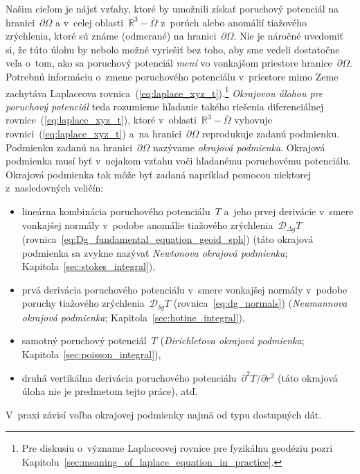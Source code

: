 \documentclass[a4paper, 12pt]{book}
\newcommand{\DIFF}{\mathcal D}
\begin{document}
Našim cieľom je nájsť vzťahy, ktoré by umožnili získať poruchový potenciál na 
hranici~$\partial \Omega$ a v~celej oblasti~$\mathbb{R}^3 - \overline{\Omega}$ 
z~porúch alebo anomálií tiažového zrýchlenia, ktoré sú známe (odmerané) na 
hranici~$\partial \Omega$.  Nie je náročné uvedomiť si, že túto úlohu by nebolo 
možné vyriešiť bez toho, aby sme vedeli dostatočne veľa o~tom, ako sa poruchový 
potenciál \emph{mení} vo vonkajšom priestore hranice~$\partial\Omega$.  
Potrebnú informáciu o~zmene poruchového potenciálu v~priestore mimo Zeme 
zachytáva Laplaceova rovnica~(\ref{eq:laplace_xyz_t}).\footnote{Pre diskusiu 
o~význame Laplaceovej rovnice pre fyzikálnu geodéziu pozri 
Kapitolu~\ref{sec:meaning_of_laplace_equation_in_practice}.}  \emph{Okrajovou 
úlohou pre poruchový potenciál} teda rozumieme hľadanie takého riešenia 
diferenciálnej rovnice~(\ref{eq:laplace_xyz_t}), ktoré v~oblasti~$\mathbb{R}^3 
- \overline\Omega$ vyhovuje rovnici~(\ref{eq:laplace_xyz_t}) a~na 
hranici~$\partial \Omega$ reprodukuje zadanú podmienku.  Podmienku zadanú na 
hranici~$\partial \Omega$ nazývame \emph{okrajová podmienka}.  Okrajová 
podmienka musí byť v~nejakom vzťahu voči hľadanému poruchovému potenciálu.  
Okrajová podmienka tak môže byť zadaná napríklad pomocou niektorej 
z~nasledovných veličín:
%
\begin{itemize}
\item lineárna kombinácia poruchového potenciálu~$T$ a~jeho prvej derivácie 
v~smere vonkajšej normály v~podobe anomálie tiažového zrýchlenia~$\DIFF_{\Delta 
g}T$ (rovnica~\ref{eq:Dg_fundamental_equation_geoid_sph}) (táto okrajová 
podmienka sa zvykne nazývať \emph{Newtonova okrajová podmienka}; 
Kapitola~\ref{sec:stokes_integral}),
%
\item prvá derivácia poruchového potenciálu v~smere vonkajšej normály v~podobe 
poruchy tiažového zrýchlenia~$\DIFF_{\delta g} T$ (rovnica~\ref{eq:dg_normals}) 
(\emph{Neumannova okrajová podmienka}; Kapitola~\ref{sec:hotine_integral}),
%
\item samotný poruchový potenciál~$T$ (\emph{Dirichletova okrajová podmienka}; 
Kapitola~\ref{sec:poisson_integral}),
%
\item druhá vertikálna derivácia poruchového potenciálu~$\partial^2 
T / \partial r^2$ (táto okrajová úloha nie je predmetom tejto práce), atď.
\end{itemize}
%
V~praxi závisí voľba okrajovej podmienky najmä od typu dostupných dát.
\end{document}
